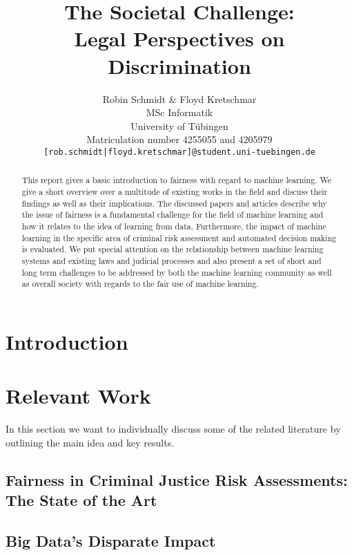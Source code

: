 \documentclass{article}
\title{The Societal Challenge: \\ Legal Perspectives on Discrimination}
\author{%
  Robin Schmidt \& Floyd Kretschmar\\
  MSc Informatik \\
  University of Tübingen\\
  Matriculation number 4255055 and 4205979\\
  \texttt{[rob.schmidt|floyd.kretschmar]@student.uni-tuebingen.de}
}
\begin{document}
\maketitle

\begin{abstract}
  This report gives a basic introduction to fairness with regard to machine learning. 
  We give a short overview over a multitude of existing works in the field and discuss their findings as well as their implications. The discussed papers and articles describe why the issue
  of fairness is a fundamental challenge for the field of machine learning and how it relates
  to the idea of learning from data. Furthermore, the impact of machine learning in the specific area of criminal risk assessment and automated decision making is evaluated. We put special attention on the relationship between machine learning systems and existing laws and judicial processes and also present a set of short and long term challenges to be 
  addressed by both the machine learning community as well as overall society with 
  regards to the fair use of machine learning.
\end{abstract}

\section{Introduction}
 \label{sec:introduction}

\section{Relevant Work}
In this section we want to individually discuss some of the related literature  \cite{machinebias, Barocas.2016, Berk.2018} by outlining the main idea and key results.

%

\subsection{Fairness in Criminal Justice Risk Assessments: The State of the Art}


\subsection{Big Data’s Disparate Impact}

\end{document}
